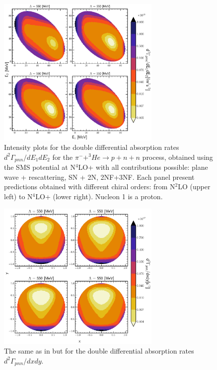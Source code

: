     \begin{figure}[h]
        \begin{center}
            \includegraphics[width=0.7\textwidth]{PlotData/PION/Dalitz_maps/figures/Dalitz_map_pnn_E1E2_orders.pdf}
        \end{center}
        \caption{Intensity plots for the double differential absorption rates
        $d^2 \Gamma_{pnn}/dE_1dE_2$ for the $\pi^- + ^3He \rightarrow p + n + n$
        process, obtained using the SMS potential at N$^4$LO+
        with all contributions possible: plane wave + rescattering, SN + 2N, 2NF+3NF.
        Each panel present predictions obtained with different chiral orders:
        from N$^2$LO (upper left) to N$^4$LO+ (lower right). Nucleon 1 is a proton.}
        \label{pion_map_E1E2_order}
    \end{figure}

    \begin{figure}[h]
        \begin{center}
        \includegraphics[width=0.7\textwidth]{PlotData/PION/Dalitz_maps/figures/Dalitz_map_pnn_xy_orders.pdf}
        \end{center}
        \caption{The same as in  but for the double differential absorption rates
        $d^2 \Gamma_{pnn}/dxdy$.}
        \label{pion_map_xy_order}
    \end{figure}

